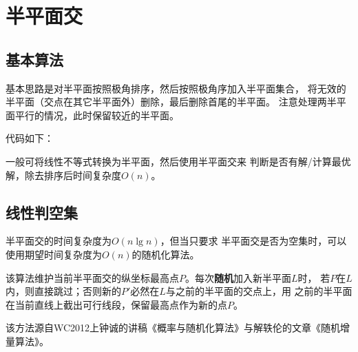 \section{半平面交}
\subsection{基本算法}
基本思路是对半平面按照极角排序，然后按照极角序加入半平面集合，
将无效的半平面（交点在其它半平面外）删除，最后删除首尾的半平面。
注意处理两半平面平行的情况，此时保留较近的半平面。

代码如下：


一般可将线性不等式转换为半平面，然后使用半平面交来
判断是否有解/计算最优解，除去排序后时间复杂度$O(n)$。
\subsection{线性判空集}
半平面交的时间复杂度为$O(n\lg n)$，但当只要求
半平面交是否为空集时，可以使用期望时间复杂度为$O(n)$的随机化算法。

该算法维护当前半平面交的纵坐标最高点$P$。每次{\bfseries 随机}加入新半平面$L$时，
若$P$在$L$内，则直接跳过；否则新的$P'$必然在$L$与之前的半平面的交点上，用
之前的半平面在当前直线上截出可行线段，保留最高点作为新的点$P$。

该方法源自WC2012上钟诚的讲稿《概率与随机化算法》与解轶伦的文章《随机增量算法》。
